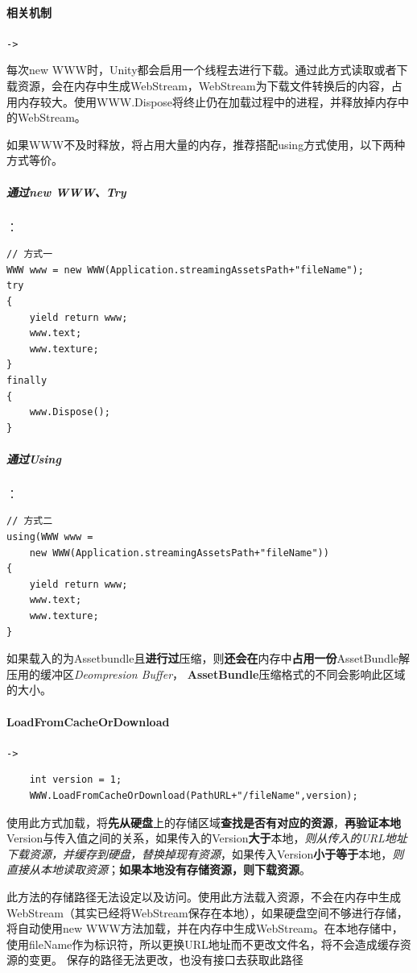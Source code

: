 \documentclass[UTF8,a4paper,12pt]{ctexbook}
\begin{document}
		\paragraph{相关机制}\verb|->|
			
			每次new WWW时，Unity都会启用一个线程去进行下载。通过此方式读取或者下载资源，会在内存中生成WebStream，WebStream为下载文件转换后的内容，占用内存较大。使用WWW.Dispose将终止仍在加载过程中的进程，并释放掉内存中的WebStream。 
			
	        如果WWW不及时释放，将占用大量的内存，推荐搭配using方式使用，以下两种方式等价。
	        \subparagraph{通过new WWW、Try}：
				\begin{lstlisting}
// 方式一			
WWW www = new WWW(Application.streamingAssetsPath+"fileName"); 
try 
{ 
	yield return www; 
	www.text; 
	www.texture; 
} 
finally 
{ 
	www.Dispose(); 
} 
				\end{lstlisting}
			
			\subparagraph{通过Using}：	
				\begin{lstlisting}
// 方式二
using(WWW www = 
	new WWW(Application.streamingAssetsPath+"fileName")) 
{ 
	yield return www; 
	www.text; 
	www.texture; 
} 	
				\end{lstlisting}
			
			如果载入的为Assetbundle且\textbf{进行过}压缩，则\textbf{还会在}内存中\textbf{占用一份}AssetBundle解压用的缓冲区\textit{Deompresion Buffer}， \textbf{AssetBundle}压缩格式的不同会影响此区域的大小。
			
		\paragraph{LoadFromCacheOrDownload}\verb|->|
			
			\begin{lstlisting}
	int version = 1; 
	WWW.LoadFromCacheOrDownload(PathURL+"/fileName",version); 
			\end{lstlisting}
			
	       使用此方式加载，将\textbf{先从硬盘}上的存储区域\textbf{查找是否有对应的资源}，\textbf{再验证本地}Version与传入值之间的关系，如果传入的Version\textbf{大于}本地，\textit{则从传入的URL地址下载资源，并缓存到硬盘，替换掉现有资源}，如果传入Version\textbf{小于等于}本地，\textit{则直接从本地读取资源}；\textbf{如果本地没有存储资源，则下载资源}。
	       
	       \color{blue}此方法的存储路径无法设定以及访问。使用此方法载入资源，不会在内存中生成 WebStream（其实已经将WebStream保存在本地），如果硬盘空间不够进行存储，将自动使用new WWW方法加载，并在内存中生成WebStream。在本地存储中，使用fileName作为标识符，所以更换URL地址而不更改文件名，将不会造成缓存资源的变更。 	
		   保存的路径无法更改，也没有接口去获取此路径\color{black}
			
\end{document}
